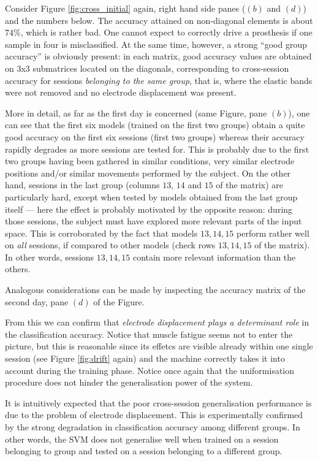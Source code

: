 Consider Figure \ref{fig:cross_initial} again, right hand side panes
($(b)$ and $(d)$) and the numbers below. The accuracy attained on
non-diagonal elements is about $74\%$, which is rather bad. One cannot
expect to correctly drive a prosthesis if one sample in four is
misclassified. At the same time, however, a strong ``good group
accuracy'' is obviously present: in each matrix, good accuracy values
are obtained on 3x3 submatrices located on the diagonals,
corresponding to cross-session accuracy for sessions \emph{belonging
to the same group}, that is, where the elastic bands were not removed
and no electrode displacement was present.

More in detail, as far as the first day is concerned (same Figure,
pane $(b)$), one can see that the first six models (trained on the
first two groups) obtain a quite good accuracy on the first six
sessions (first two groups) whereas their accuracy rapidly degrades as
more sessions are tested for. This is probably due to the first two
groups having been gathered in similar conditions, very similar
electrode positions and/or similar movements performed by the
subject. On the other hand, sessions in the last group (columns $13$,
$14$ and $15$ of the matrix) are particularly hard, except when tested
by models obtained from the last group itself --- here the effect is
probably motivated by the opposite reason: during those sessions, the
subject must have explored more relevant parts of the input
space. This is corroborated by the fact that models $13,14,15$ perform
rather well on \emph{all} sessions, if compared to other models (check
rows $13,14,15$ of the matrix). In other words, sessions $13,14,15$
contain more relevant information than the others.

Analogous considerations can be made by inspecting the accuracy matrix
of the second day, pane $(d)$ of the Figure.

From this we can confirm that \emph{electrode displacement plays a
determinant role} in the classification accuracy. Notice that muscle
fatigue seems not to enter the picture, but this is reasonable since
its effetcs are visible already within one single session (see Figure
\ref{fig:drift} again) and the machine correctly takes it into account
during the training phase. Notice once again that the uniformisation
procedure does not hinder the generalisation power of the system.

It is intuitively expected that the poor cross-session generalisation
performance is due to the problem of electrode displacement. This is
experimentally confirmed by the strong degradation in classification
accuracy among different groups. In other words, the SVM does not
generalise well when trained on a session belonging to group and
tested on a session belonging to a different group.

